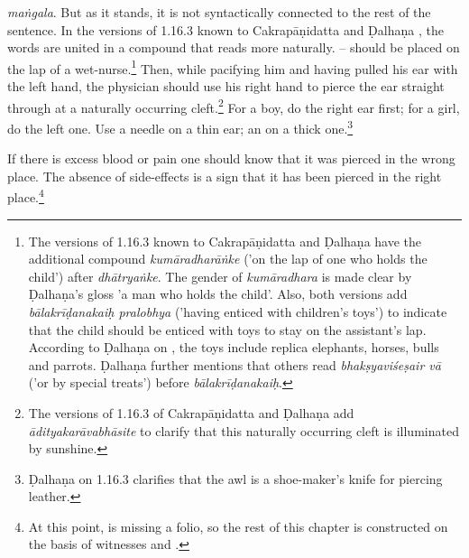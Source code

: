 \begin{translation}
{    \emph{maṅgala}.  But as it stands, it is not syntactically connected to the rest of the sentence. In the versions of 1.16.3 known to Cakrapāṇidatta \citep[126]{acar-1939} and Ḍalhaṇa \citep[76]{vulgate}, the words are united in a compound that reads more naturally.} -- should be placed on the lap of a wet-nurse.\footnote{The versions of 1.16.3 known to Cakrapāṇidatta \citep[126]{acar-1939} and Ḍalhaṇa \citep[76]{vulgate} have the additional compound \emph{kumāradharāṅke} ('on the lap of one who holds the child') after \emph{dhātryaṅke}. The gender of \emph{kumāradhara} is made clear by  Ḍalhaṇa's gloss 'a man who holds the child'. Also, both versions add \emph{bālakrīḍanakaiḥ pralobhya} ('having enticed with children's toys') to indicate that the child should be enticed with toys to stay on the assistant's lap. According to Ḍalhaṇa on , the toys include replica elephants, horses, bulls and parrots. Ḍalhaṇa further mentions that others read \emph{bhakṣyaviśeṣair vā} ('or by special treats') before \emph{bālakrīḍanakaiḥ}.} Then, while pacifying him and having pulled his ear with the left hand, the physician should use his right hand to pierce the ear straight through at a naturally occurring cleft.\footnote{The versions of 1.16.3 of Cakrapāṇidatta \citep[126]{acar-1939} and Ḍalhaṇa \citep[76]{vulgate} add \emph{ādityakarāvabhāsite} to clarify that this naturally occurring cleft is illuminated by sunshine.} For a boy, do
    the right ear first; for a girl, do the left one. Use a needle on a
    thin ear; an  on a thick one.\footnote{Ḍalhaṇa on 1.16.3 \citep[76]{vulgate} clarifies that the awl is a shoe-maker's knife for piercing leather.}
    
    \item [3]  If there is excess blood or pain one should know that it was pierced
    in the wrong place. The absence of side-effects is a sign that it has been pierced 
    in the right place.\footnote{At this point,  is missing a folio, so the rest of this chapter
    is constructed on the basis of witnesses  and 
    .}
    

\end{translation}
